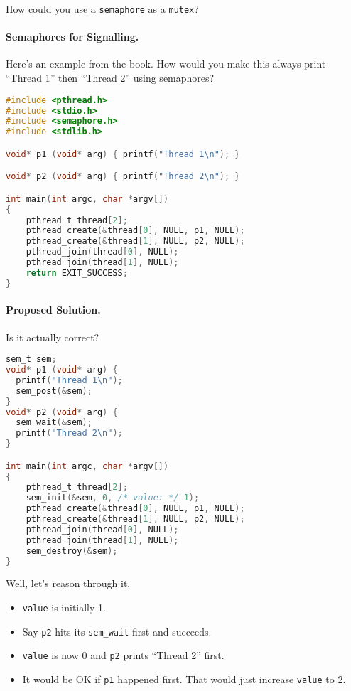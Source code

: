 \noindent
How could you use a {\tt semaphore} as a {\tt mutex}?
\vspace*{3em}


\paragraph{Semaphores for Signalling.}
Here's an example from the book. How would you make this always print
``Thread 1'' then ``Thread 2'' using semaphores?

\begin{lstlisting}[language=C]
#include <pthread.h>
#include <stdio.h>
#include <semaphore.h>
#include <stdlib.h>

void* p1 (void* arg) { printf("Thread 1\n"); }

void* p2 (void* arg) { printf("Thread 2\n"); }

int main(int argc, char *argv[])
{
    pthread_t thread[2];
    pthread_create(&thread[0], NULL, p1, NULL);
    pthread_create(&thread[1], NULL, p2, NULL);
    pthread_join(thread[0], NULL);
    pthread_join(thread[1], NULL);
    return EXIT_SUCCESS;
}
\end{lstlisting}

\paragraph{Proposed Solution.} Is it actually correct?

\begin{lstlisting}[language=C]
sem_t sem;
void* p1 (void* arg) {
  printf("Thread 1\n");
  sem_post(&sem);
}
void* p2 (void* arg) {
  sem_wait(&sem);
  printf("Thread 2\n");
}

int main(int argc, char *argv[])
{
    pthread_t thread[2];
    sem_init(&sem, 0, /* value: */ 1);
    pthread_create(&thread[0], NULL, p1, NULL);
    pthread_create(&thread[1], NULL, p2, NULL);
    pthread_join(thread[0], NULL);
    pthread_join(thread[1], NULL);
    sem_destroy(&sem);
}
\end{lstlisting}

Well, let's reason through it.  
  \begin{itemize}
    \item {\tt value} is initially 1.
    \item Say {\tt p2} hits its {\tt sem\_wait} first and succeeds.
    \item {\tt value} is now 0 and {\tt p2} prints ``Thread 2'' first.
    \item It would be OK if {\tt p1} happened first. That would just increase
      {\tt value} to 2.
    \end{itemize}

